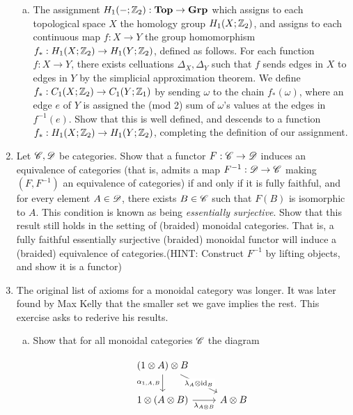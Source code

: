 \documentclass{article}
\theoremstyle{definition}
\numberwithin{figure}{section}
\begin{document}
\begin{enumerate}[\thesection .1.]
\begin{enumerate}[(a)]
\item The assignment $H_1(\--;\mathbb{Z}_2):\bold{Top}\to \bold{Grp}$ which assigns to each topological space $X$ the homology group $H_1(X;\mathbb{Z}_2)$, and assigns to each continuous map $f:X\to Y$ the group homomorphism $f_*: H_1(X;\mathbb{Z}_2)\to H_1(Y;\mathbb{Z}_2)$, defined as follows. For each function $f:X\to Y$, there exists celluations $\Delta_X,\Delta_Y$ such that $f$ sends edges in $X$ to edges in $Y$ by the simplicial approximation theorem. We define $f_*:C_1(X;\mathbb{Z}_2)\to C_1(Y;\mathbb{Z}_1)$ by sending $\omega$ to the chain $f_*(\omega)$, where an edge $e$ of $Y$ is assigned the (mod 2) sum of $\omega$'s values at the edges in $f^{-1}(e)$. Show that this is well defined, and descends to a function $f_*:H_1(X;\mathbb{Z}_2)\to H_1(Y;\mathbb{Z}_2)$, completing the definition of our assignment.
\end{enumerate}

\item Let $\mathscr{C},\mathscr{D}$ be categories. Show that a functor $F:\mathscr{C}\to \mathscr{D}$ induces an equivalence of categories (that is, admits a map $F^{-1}:\mathscr{D}\to \mathscr{C}$ making $(F,F^{-1})$ an equivalence of categories) if and only if it is fully faithful, and for every element $A\in \mathscr{D}$, there exists $B\in \mathscr{C}$ such that $F(B)$ is isomorphic to $A$. This condition is known as being \textit{essentially surjective}. Show that this result still holds in the setting of (braided) monoidal categories. That is, a fully faithful essentially surjective (braided) monoidal functor will induce a (braided) equivalence of categories.(HINT: Construct $F^{-1}$ by lifting objects, and show it is a functor)

\item The original list of axioms for a monoidal category was longer. It was later found by Max Kelly \cite{kelly1964maclane} that the smaller set we gave implies the rest. This exercise asks to rederive his results.

\begin{enumerate}[(a)]

\item Show that for all monoidal categories $\mathscr{C}$ the diagram

\[\begin{tikzcd}
	{(1\otimes A)\otimes B} \\
	{1\otimes (A\otimes B)} & {A\otimes B}
	\arrow["{\lambda_A\otimes\id_{B}}"{description}, from=1-1, to=2-2]
	\arrow["{\alpha_{1,A,B}}"', from=1-1, to=2-1]
	\arrow["{\lambda_{A\otimes B}}"', from=2-1, to=2-2]
\end{tikzcd}\]


\end{enumerate}
\end{enumerate}
\end{document}
